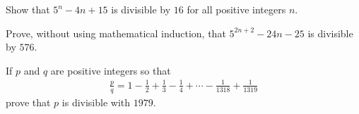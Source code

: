 \documentclass{subfile}
\begin{document}
%

	\begin{problem}
		Show that $5^{n} -4n+15$ is divisible by $16$ for all positive integers $n$.
	\end{problem}


	\begin{problem}
		Prove, without using mathematical induction, that  $5^{2n+2} -24 n -25$ is divisible by $576$.
	\end{problem}


	\begin{problem}
		If $p$ and $q$ are positive integers so that
			\begin{align*}
				\frac{p}{q}=1-\frac{1}{2}+\frac{1}{3}-\frac{1}{4}+ \cdots -\frac{1}{1318}+\frac{1}{1319}
			\end{align*}
		prove that $p$ is divisible with $1979$. %
	\end{problem}
\end{document}
